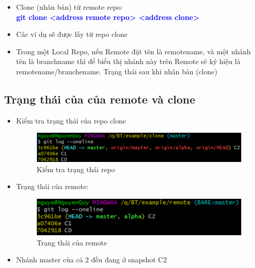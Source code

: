 \documentclass[12pt,a4paper]{report}
\begin{document}
\begin{itemize}
\item Clone (nhân bản) từ remote repo:\\ \textcolor{blue}{\bf git clone <address remote repo> <address clone>}
\item Các ví dụ sẽ được lấy từ repo clone
\item Trong một Local Repo, nếu Remote đặt tên là remotename, và một nhánh tên là branchname thì để biểu thị nhánh này trên Remote sẽ ký hiệu là remotename/branchename. Trạng thái sau khi nhân bản (clone)
\end{itemize}
\subsection{Trạng thái của của remote và clone}
\begin{itemize}
\item Kiểm tra trạng thái của repo clone

\begin{figure}[!ht]
	\centering
 	\includegraphics[width=0.8\linewidth]{screenshot067}
 \caption{Kiểm tra trạng thái repo}
 	\label{fig:screenshot067}
\end{figure}

\item Trạng thái của remote:

\begin{figure}[!ht]
	\centering
 	\includegraphics[width=0.8\linewidth]{screenshot068}
\caption{Trạng thái của remote}
 	\label{fig:screenshot068}
\end{figure}

\item Nhánh master của cả 2 đều đang ở snapshot C2
\end{itemize}
\end{document}
